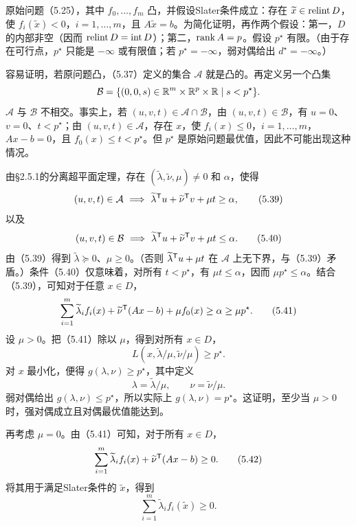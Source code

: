 原始问题（5.25），其中 $f_0,\ldots,f_m$ 凸，并假设Slater条件成立：存在 $\widetilde x\in\operatorname{relint} D$，使 $f_i(\widetilde x)<0$，$i=1,\ldots,m$，且 $A\widetilde x=b$。为简化证明，再作两个假设：第一，$D$ 的内部非空（因而 $\operatorname{relint} D=\operatorname{int}D$）；第二，$\operatorname{rank} A=p$。假设 $p^\star$ 有限。（由于存在可行点，$p^\star$ 只能是 $-\infty$ 或有限值；若 $p^\star=-\infty$，弱对偶给出 $d^\star=-\infty$。）

容易证明，若原问题凸，（5.37）定义的集合 $\mathcal A$ 就是凸的。再定义另一个凸集
\[
\mathcal B=\{(0,0,s)\in\mathbb R^m\times\mathbb R^p\times\mathbb R\mid s<p^\star\}.
\]
$\mathcal A$ 与 $\mathcal B$ 不相交。事实上，若 $(u,v,t)\in\mathcal A\cap\mathcal B$，由 $(u,v,t)\in\mathcal B$，有 $u=0$、$v=0$、$t<p^\star$；由 $(u,v,t)\in\mathcal A$，存在 $x$，使 $f_i(x)\le0$，$i=1,\ldots,m$，$Ax-b=0$，且 $f_0(x)\le t<p^\star$。但 $p^\star$ 是原始问题最优值，因此不可能出现这种情况。

由§2.5.1的分离超平面定理，存在 $(\widetilde\lambda,\widetilde\nu,\mu)\ne0$ 和 $\alpha$，使得
\begin{equation}
(u,v,t)\in\mathcal A\ \Longrightarrow\
\widetilde\lambda^\mathsf T u+\widetilde\nu^\mathsf T v+\mu t\ge\alpha,\tag{5.39}
\end{equation}
以及
\begin{equation}
(u,v,t)\in\mathcal B\ \Longrightarrow\
\widetilde\lambda^\mathsf T u+\widetilde\nu^\mathsf T v+\mu t\le\alpha.\tag{5.40}
\end{equation}
由（5.39）得到 $\widetilde\lambda\succeq0$、$\mu\ge0$。（否则 $\widetilde\lambda^\mathsf T u+\mu t$ 在 $\mathcal A$ 上无下界，与（5.39）矛盾。）条件（5.40）仅意味着，对所有 $t<p^\star$，有 $\mu t\le\alpha$，因而 $\mu p^\star\le\alpha$。结合（5.39），可知对于任意 $x\in D$，
\begin{equation}
\sum_{i=1}^m\widetilde\lambda_i f_i(x)
+\widetilde\nu^\mathsf T(Ax-b)+\mu f_0(x)\ge\alpha\ge\mu p^\star.\tag{5.41}
\end{equation}
设 $\mu>0$。把（5.41）除以 $\mu$，得到对所有 $x\in D$，
\[
L(x,\widetilde\lambda/\mu,\widetilde\nu/\mu)\ge p^\star.
\]
对 $x$ 最小化，便得 $g(\lambda,\nu)\ge p^\star$，其中定义
\[
\lambda=\widetilde\lambda/\mu,\qquad \nu=\widetilde\nu/\mu.
\]
弱对偶给出 $g(\lambda,\nu)\le p^\star$，所以实际上 $g(\lambda,\nu)=p^\star$。这证明，至少当 $\mu>0$ 时，强对偶成立且对偶最优值能达到。

再考虑 $\mu=0$。由（5.41）可知，对于所有 $x\in D$，
\begin{equation}
\sum_{i=1}^m\widetilde\lambda_i f_i(x)+\widetilde\nu^\mathsf T(Ax-b)\ge0.\tag{5.42}
\end{equation}
将其用于满足Slater条件的 $\widetilde x$，得到
\[
\sum_{i=1}^m\widetilde\lambda_i f_i(\widetilde x)\ge0.
\]

